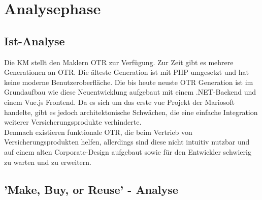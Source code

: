 \section{Analysephase}
\label{analysephase}

\subsection{Ist-Analyse}
\label{ist}
\begin{comment}
evtl alte otrs mit nutzwertanalyse vergleichen?
\end{comment}
Die \ac{KM} stellt den Maklern \ac{OTR} zur Verfügung. Zur Zeit gibt es mehrere Generationen an \ac{OTR}. Die älteste Generation ist mit PHP umgesetzt und hat keine moderne Benutzeroberfläche. Die bis heute neuste \ac{OTR} Generation ist im Grundaufbau wie diese Neuentwicklung aufgebaut mit einem .NET-Backend und einem Vue.js Frontend. Da es sich um das erste \gls{vue} Projekt der Mariosoft handelte, gibt es jedoch architektonische Schwächen, die eine einfache Integration weiterer Versicherungsprodukte verhinderte. \\
Demnach existieren funktionale \ac{OTR}, die beim Vertrieb von Versicherungsprodukten helfen, allerdings sind diese nicht intuitiv nutzbar und auf einem alten Corporate-Design aufgebaut sowie für den Entwickler schwierig zu warten und zu erweitern.

\subsection{'Make, Buy, or Reuse' - Analyse}
\label{makeOrBuy}


